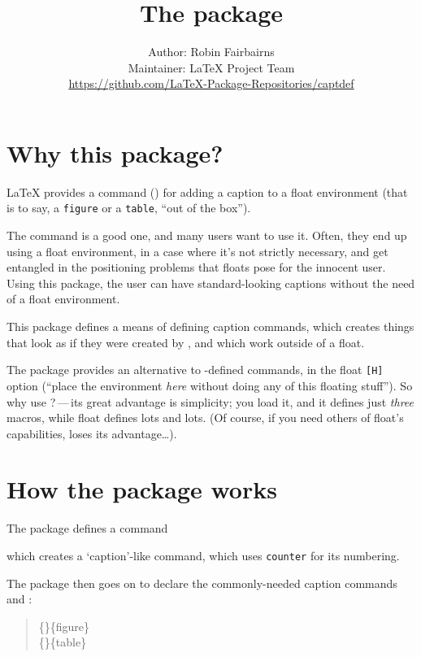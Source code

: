 \documentclass[a4paper]{l3in2edoc}
\begin{document}
\title{The  package}
\author{
  Author: Robin Fairbairns\\
  Maintainer: \LaTeX{} Project Team\\
  \normalsize
  \url{https://github.com/LaTeX-Package-Repositories/captdef}%
  }
\maketitle

\section{Why this package?}

\LaTeX{} provides a command () for adding a caption to a
float environment (that is to say, a \texttt{figure} or a
\texttt{table}, ``out of the box'').

The command is a good one, and many users want to use it.  Often,
they end up using a float environment, in a case where it's not
strictly necessary, and get entangled in the positioning problems
that floats pose for the innocent user.  Using this package, the
user can have standard-looking captions without the need of a float
environment.

This package defines a means of defining caption commands, which
creates things that look as if they were created by , and
which work outside of a float.

The  package provides an alternative to
-defined commands, in the float \texttt{[H]} option
(``place the environment \emph{here} without doing any of this
floating stuff'').  So why use ?\,---\,its great
advantage is simplicity; you load it, and it defines just \emph{three}
macros, while \textsf{float} defines lots and lots.  (Of course, if
you need others of \textsf{float}'s capabilities, 
loses its advantage\dots).

\section{How the package works}

The package defines a command
\begin{quote}
\end{quote}
which creates a `caption'-like command, which uses \texttt{counter}
for its numbering.

The package then goes on to declare the commonly-needed caption
commands  and :
\begin{quote}
 \ttfamily
 \{\}\{figure\}\\
 \{\}\{table\}
\end{quote}
\end{document}
